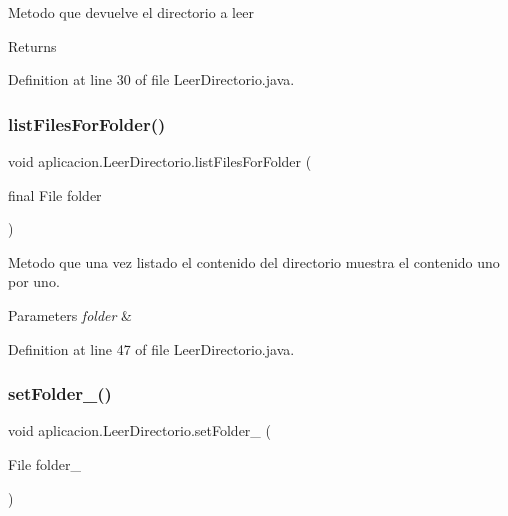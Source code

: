 Metodo que devuelve el directorio a leer \begin{DoxyReturn}{Returns}

\end{DoxyReturn}


Definition at line 30 of file Leer\+Directorio.\+java.

\hypertarget{classaplicacion_1_1_leer_directorio_a59321b6374b5ef72ac862f6b283399c9}{}\label{classaplicacion_1_1_leer_directorio_a59321b6374b5ef72ac862f6b283399c9} 
\subsubsection{\texorpdfstring{list\+Files\+For\+Folder()}{listFilesForFolder()}}
{\footnotesize\ttfamily void aplicacion.\+Leer\+Directorio.\+list\+Files\+For\+Folder (\begin{DoxyParamCaption}\item[{final File}]{folder }\end{DoxyParamCaption})}

Metodo que una vez listado el contenido del directorio muestra el contenido uno por uno. 
\begin{DoxyParams}{Parameters}
{\em folder} & \\
\hline
\end{DoxyParams}


Definition at line 47 of file Leer\+Directorio.\+java.

\hypertarget{classaplicacion_1_1_leer_directorio_a42152251cb0eaf44b59e8ea92ebcc165}{}\label{classaplicacion_1_1_leer_directorio_a42152251cb0eaf44b59e8ea92ebcc165} 
\subsubsection{\texorpdfstring{set\+Folder\+\_\+()}{setFolder\_()}}
{\footnotesize\ttfamily void aplicacion.\+Leer\+Directorio.\+set\+Folder\+\_\+ (\begin{DoxyParamCaption}\item[{File}]{folder\+\_\+ }\end{DoxyParamCaption})}

